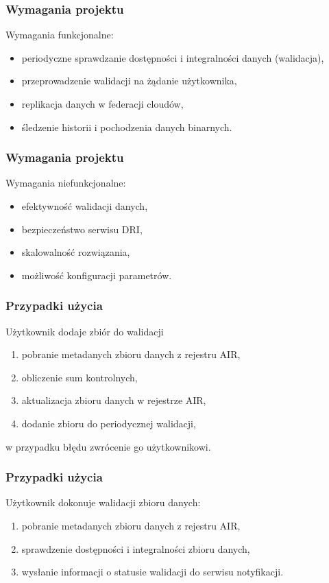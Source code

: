 \documentclass{beamer}
\begin{document}
\begin{frame}
\frametitle{Wymagania projektu}
\begin{block}{Wymagania funkcjonalne:}
\begin{itemize}
	\item periodyczne sprawdzanie dostępności i integralności danych (walidacja),
	\item przeprowadzenie walidacji na żądanie użytkownika,
	\item replikacja danych w federacji cloudów,
	\item śledzenie historii i pochodzenia danych binarnych.
\end{itemize}
\end{block}
\end{frame}
\begin{frame}
\frametitle{Wymagania projektu}
\begin{block}{Wymagania niefunkcjonalne:}
\begin{itemize}
	\item efektywność walidacji danych,
	\item bezpieczeństwo serwisu DRI,
	\item skalowalność rozwiązania,
	\item możliwość konfiguracji parametrów.
\end{itemize}
\end{block}
\end{frame}

\begin{frame}
\frametitle{Przypadki użycia}
\begin{block}{Użytkownik dodaje zbiór do walidacji}
\begin{enumerate}
	\item pobranie metadanych zbioru danych z rejestru AIR,
	\item obliczenie sum kontrolnych,
	\item aktualizacja zbioru danych w rejestrze AIR,
	\item dodanie zbioru do periodycznej walidacji,
\end{enumerate}
w przypadku błędu zwrócenie go użytkownikowi.
\end{block}
\end{frame}

\begin{frame}
\frametitle{Przypadki użycia}
\begin{block}{Użytkownik dokonuje walidacji zbioru danych:}
\begin{enumerate}
	\item pobranie metadanych zbioru danych z rejestru AIR,
	\item sprawdzenie dostępności i integralności zbioru danych,
	\item wysłanie informacji o statusie walidacji do serwisu notyfikacji.
\end{enumerate}
\end{block}
\end{frame}
\end{document}

